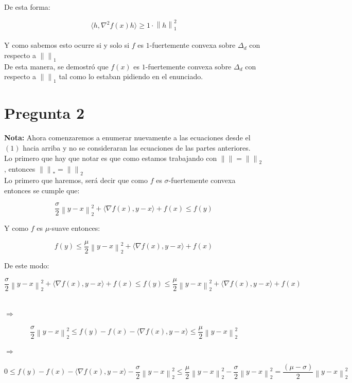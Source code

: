 \documentclass[11pt]{article}
\begin{document}
De esta forma:

\[ \langle h, \nabla^2 f(x) h \rangle \geq 1 \cdot \left\| h \right\|_1^2 \] \\

Y como sabemos esto ocurre si y solo si $ f $ es $1$-fuertemente convexa sobre $ \Delta_d $ con respecto a $ \left\|  \right\|_1 $ \\

De esta manera, se demostró que $ f(x) $ es $1$-fuertemente convexa sobre $ \Delta_d $ con respecto a $ \left\|  \right\|_1 $ tal como lo estaban pidiendo en el enunciado. \\

\hrulefill

\section*{Pregunta 2}

\textbf{Nota:} Ahora comenzaremos a enumerar nuevamente a las ecuaciones desde el $(1)$ hacia arriba y no se consideraran las ecuaciones de las partes anteriores. \\

Lo primero que hay que notar es que como estamos trabajando con $ \left\|  \right\| = \left\|  \right\|_2 $, entonces $  \left\|  \right\|_{*} = \left\|  \right\|_2 $ \\ 

Lo primero que haremos, será decir que como $ f $ es $ \sigma $-fuertemente convexa entonces se cumple que:

\[ \frac{\sigma}{2} \left\| y-x \right\|_2^2 + \langle \nabla f(x), y-x \rangle + f(x) \leq f(y) \]

Y como $ f $ es $ \mu$-suave entonces:

\[ f(y) \leq \frac{\mu}{2} \left\| y-x \right\|_2^2 + \langle \nabla f(x), y-x \rangle + f(x) \]

De este modo:

\[ \frac{\sigma}{2} \left\| y-x \right\|_2^2 + \langle \nabla f(x), y-x \rangle + f(x) \leq f(y) \leq \frac{\mu}{2} \left\| y-x \right\|_2^2 + \langle \nabla f(x), y-x \rangle + f(x)  \] \

$ \Rightarrow $ \

\[ \frac{\sigma}{2} \left\| y-x \right\|_2^2    \leq f(y) - f(x) - \langle \nabla f(x), y-x \rangle \leq \frac{\mu}{2} \left\| y-x \right\|_2^2   \]

$ \Rightarrow $ \

\[ 0 \leq f(y) - f(x) - \langle \nabla f(x), y-x \rangle - \frac{\sigma}{2} \left\| y-x \right\|_2^2 \leq \frac{\mu}{2} \left\| y-x \right\|_2^2 - \frac{\sigma}{2} \left\| y-x \right\|_2^2 = \frac{(\mu - \sigma)}{2} \left\| y-x \right\|_2^2   \] \
\end{document}
